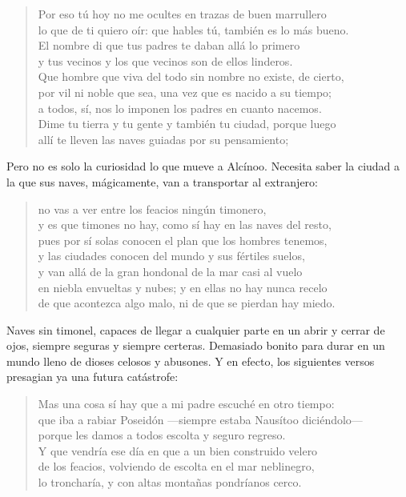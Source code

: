 \documentclass[11pt,a4paper]{article}
\begin{document}
\begin{verse}
Por eso tú hoy no me ocultes en trazas de buen marrullero\\
lo que de ti quiero oír: que hables tú, también es lo más bueno.\\
El nombre di que tus padres te daban allá lo primero\\
y tus vecinos y los que vecinos son de ellos linderos.\\
Que hombre que viva del todo sin nombre no existe, de cierto,\\
por vil ni noble que sea, una vez que es nacido a su tiempo;\\
a todos, sí, nos lo imponen los padres en cuanto nacemos.\\
Dime tu tierra y tu gente y también tu ciudad, porque luego\\
allí te lleven las naves guiadas por su pensamiento;
\end{verse}

Pero no es solo la curiosidad lo que mueve a Alcínoo. Necesita saber la ciudad a la que sus naves, mágicamente, van a transportar al extranjero:

\begin{verse}
no vas a ver entre los feacios ningún timonero,\\
y es que timones no hay, como sí hay en las naves del resto,\\
pues por sí solas conocen el plan que los hombres tenemos,\\
y las ciudades conocen del mundo y sus fértiles suelos,\\
y van allá de la gran hondonal de la mar casi al vuelo\\
en niebla envueltas y nubes; y en ellas no hay nunca recelo\\
de que acontezca algo malo, ni de que se pierdan hay miedo.
\end{verse}

Naves sin timonel, capaces de llegar a cualquier parte en un abrir y cerrar de ojos, siempre seguras y siempre certeras. Demasiado bonito para durar en un mundo lleno de dioses celosos y abusones. Y en efecto, los siguientes versos presagian ya una futura catástrofe:

\begin{verse}
Mas una cosa sí hay que a mi padre escuché en otro tiempo:\\
que iba a rabiar Poseidón ---siempre estaba Nausítoo diciéndolo---\\
porque les damos a todos escolta y seguro regreso.\\
Y que vendría ese día en que a un bien construido velero\\
de los feacios, volviendo de escolta en el mar neblinegro,\\
lo troncharía, y con altas montañas pondríanos cerco.
\end{verse}
\end{document}
